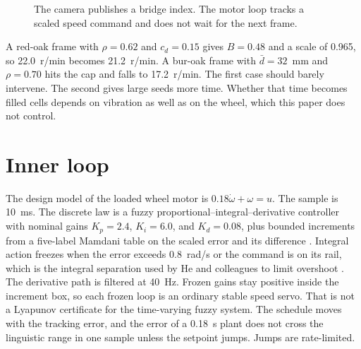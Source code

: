 \documentclass[11pt,a4paper]{article}
\begin{document}
\begin{figure}[ht]
\centering
{}
\caption{The camera publishes a bridge index. The motor loop tracks a scaled speed command and does not wait for the next frame.}
\end{figure}

A red-oak frame with $\rho=0.62$ and $c_d=0.15$ gives $B=0.48$ and a scale of 0.965, so 22.0~r/min becomes 21.2~r/min. A bur-oak frame with $\bar d=32$~mm and $\rho=0.70$ hits the cap and falls to 17.2~r/min. The first case should barely intervene. The second gives large seeds more time. Whether that time becomes filled cells depends on vibration as well as on the wheel, which this paper does not control.

\section{Inner loop}

The design model of the loaded wheel motor is $0.18\dot\omega+\omega=u$. The sample is 10~ms. The discrete law is a fuzzy proportional--integral--derivative controller with nominal gains $K_p=2.4$, $K_i=6.0$, and $K_d=0.08$, plus bounded increments from a five-label Mamdani table on the scaled error and its difference \cite{mamdani1974,zadeh1965,astrom2006}. Integral action freezes when the error exceeds 0.8~rad/s or the command is on its rail, which is the integral separation used by He and colleagues to limit overshoot \cite{he2017}. The derivative path is filtered at 40~Hz. Frozen gains stay positive inside the increment box, so each frozen loop is an ordinary stable speed servo. That is not a Lyapunov certificate for the time-varying fuzzy system. The schedule moves with the tracking error, and the error of a 0.18~s plant does not cross the linguistic range in one sample unless the setpoint jumps. Jumps are rate-limited.
\end{document}
